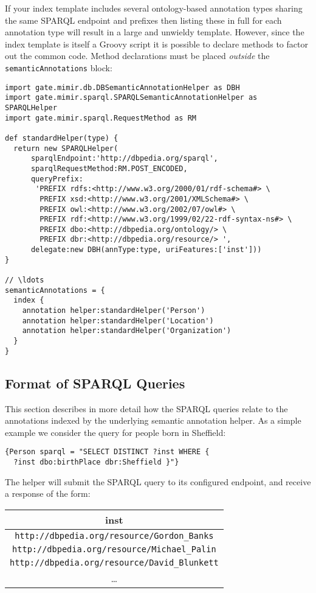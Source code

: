 If your index template includes several ontology-based annotation types sharing
the same SPARQL endpoint and prefixes then listing these in full for each
annotation type will result in a large and unwieldy template.  However, since
the index template is itself a Groovy script it is possible to declare methods
to factor out the common code.  Method declarations must be placed
{\em outside} the {\tt semanticAnnotations} block:
\begin{lstlisting}[texcl, breaklines, breakindent=150pt]
import gate.mimir.db.DBSemanticAnnotationHelper as DBH
import gate.mimir.sparql.SPARQLSemanticAnnotationHelper as SPARQLHelper
import gate.mimir.sparql.RequestMethod as RM

def standardHelper(type) {
  return new SPARQLHelper(
      sparqlEndpoint:'http://dbpedia.org/sparql',
      sparqlRequestMethod:RM.POST_ENCODED,
      queryPrefix:
       'PREFIX rdfs:<http://www.w3.org/2000/01/rdf-schema#> \
        PREFIX xsd:<http://www.w3.org/2001/XMLSchema#> \
        PREFIX owl:<http://www.w3.org/2002/07/owl#> \
        PREFIX rdf:<http://www.w3.org/1999/02/22-rdf-syntax-ns#> \
        PREFIX dbo:<http://dbpedia.org/ontology/> \
        PREFIX dbr:<http://dbpedia.org/resource/> ',
      delegate:new DBH(annType:type, uriFeatures:['inst']))
}

// \ldots
semanticAnnotations = {
  index {
    annotation helper:standardHelper('Person')
    annotation helper:standardHelper('Location')
    annotation helper:standardHelper('Organization')
  }
}
\end{lstlisting}

\subsection{Format of SPARQL Queries}

This section describes in more detail how the SPARQL queries relate to the
annotations indexed by the underlying semantic annotation helper.  As a simple
example we consider the query for people born in Sheffield:
\begin{verbatim}
{Person sparql = "SELECT DISTINCT ?inst WHERE {
  ?inst dbo:birthPlace dbr:Sheffield }"}
\end{verbatim}
%
The helper will submit the SPARQL query to its configured endpoint, and receive
a response of the form:

\begin{tabular}{|c|}
\hline
{\bf inst} \\
\hline
{\tt http://dbpedia.org/resource/Gordon\_Banks} \\
{\tt http://dbpedia.org/resource/Michael\_Palin} \\
{\tt http://dbpedia.org/resource/David\_Blunkett} \\
\ldots \\
\hline
\end{tabular}

